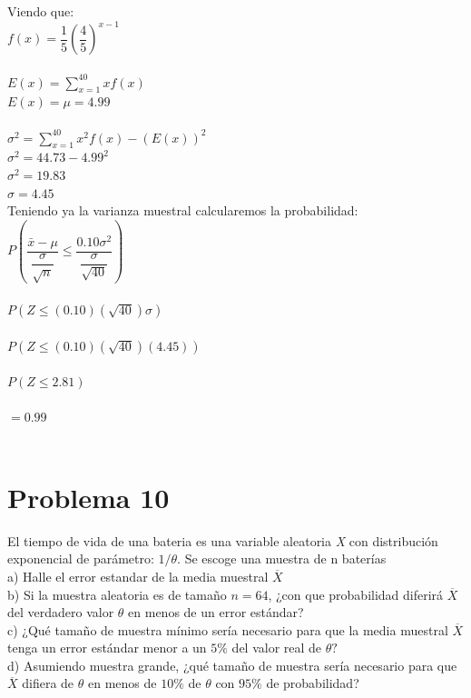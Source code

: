 \documentclass[a4paper,openright,12pt]{book}
\begin{document}
{\textmd{Viendo que:} \\ 
$f(x)=\dfrac{1}{5}\left(\dfrac{4}{5} \right)^{x-1}$\\
\\
$E(x) = \sum_{x=1}^{40}x f(x)$\\
$E(x)=\mu=4.99$\\
\\
$\sigma^{2}=\sum_{x=1}^{40}x^{2} f(x)-(E(x))^{2}$\\
$\sigma^{2}=44.73-4.99^{2}$\\
$\sigma^{2}=19.83$\\
$\sigma=4.45$
\\
\textmd{Teniendo ya la varianza muestral calcularemos la probabilidad:}\\
$P\left(\dfrac{\bar{x}-\mu}{\dfrac{\sigma}{\sqrt{n}}}\leq \dfrac{0.10\sigma^{2}}{\dfrac{\sigma}{\sqrt{40}}}\right) $\\
\\
$P(Z\leq (0.10)(\sqrt{40})\sigma)$\\
\\
$P(Z\leq (0.10)(\sqrt{40})(4.45))$\\
\\
$P(Z\leq 2.81)$\\
\\
$=0.99$\\
\\


\section{Problema 10}
%
El tiempo de vida de una bateria es una variable aleatoria \textit{X} con distribución exponencial de parámetro: $1/\theta$. Se escoge una muestra de n baterías\\
a) Halle el error estandar de la media muestral $\overline{X}$\\
b) Si la muestra aleatoria es de tamaño $ n = 64 $, ¿con que probabilidad diferirá $\overline{X}$ del verdadero valor $\theta$ en menos de un error estándar?\\
c) ¿Qué tamaño de muestra mínimo sería necesario para que la media muestral $\overline{X}$ tenga un error estándar menor a un $5\%$ del valor real de $\theta?$\\
d) Asumiendo muestra grande, ¿qué tamaño de muestra sería necesario para que $\overline{X}$ difiera de $\theta$ en menos de $10\%$
de $\theta$ con $95\%$ de probabilidad?\\

}
\end{document}
